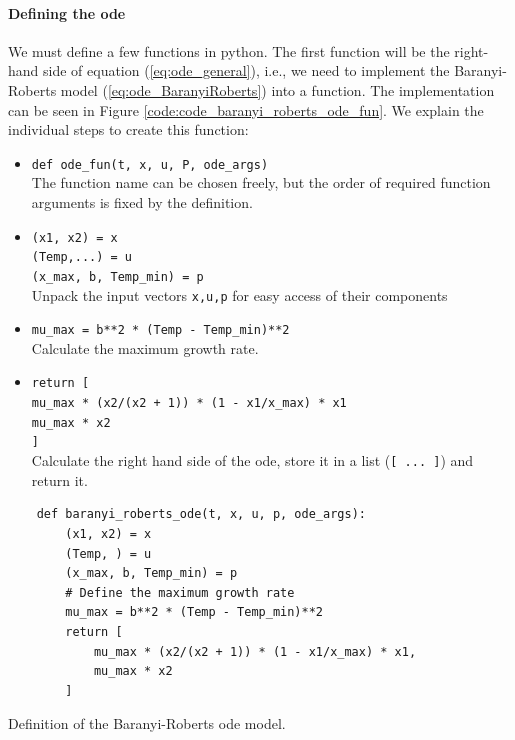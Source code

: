 \documentclass[10pt,A4paper]{article}
\begin{document}
\paragraph{Defining the \acs{ode}} 
We must define a few functions in python. The first function will be the right-hand side of equation (\ref{eq:ode_general}), i.e., we need to implement the Baranyi-Roberts model (\ref{eq:ode_BaranyiRoberts}) into a function. 
The implementation can be seen in Figure \ref{code:code_baranyi_roberts_ode_fun}. We explain the individual steps to create this function:
\begin{itemize}
\item  \texttt{def ode_fun(t, x, u, P, ode_args)}\\
The function name can be chosen freely, but the order of required function arguments is fixed by the definition.  
\item \texttt{(x1, x2) = x}\\
\texttt{(Temp,...) = u}\\
\texttt{(x_max, b, Temp_min) = p}\\
Unpack the input vectors \texttt{x,u,p} for easy access of their components
\item \texttt{mu_max = b**2 * (Temp - Temp_min)**2}\\
Calculate the maximum growth rate.
\item \texttt{return [}\\
\texttt{mu_max * (x2/(x2 + 1)) * (1 - x1/x_max) * x1}\\
\texttt{mu_max * x2}\\
\texttt{]}\\
Calculate the right hand side of the \acs{ode}, store it in a list (\texttt{[ ... ]}) and return it.
\end{itemize}

\begin{code}[h]
    \begin{verbatim}
    def baranyi_roberts_ode(t, x, u, p, ode_args):
        (x1, x2) = x
        (Temp, ) = u
        (x_max, b, Temp_min) = p
        # Define the maximum growth rate
        mu_max = b**2 * (Temp - Temp_min)**2
        return [
            mu_max * (x2/(x2 + 1)) * (1 - x1/x_max) * x1,
            mu_max * x2
        ]
    \end{verbatim}
    \caption{Definition of the Baranyi-Roberts \ac{ode} model.}
    \label{code:code_baranyi_roberts_ode_fun}
\end{code}
%
\end{document}

